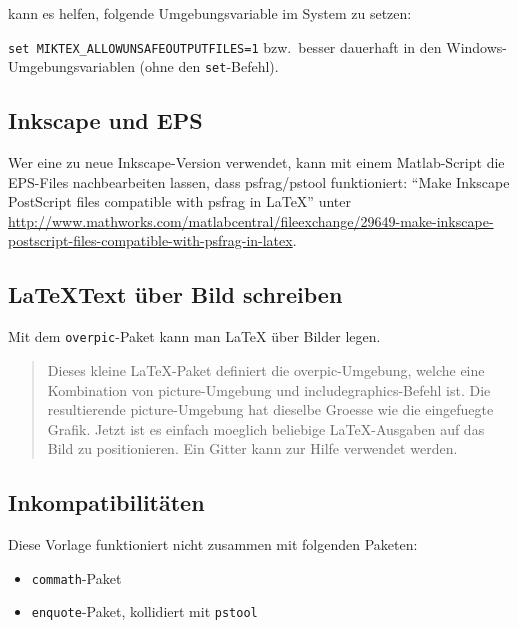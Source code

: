 kann es helfen, folgende Umgebungsvariable im System zu setzen:

\verb+set MIKTEX_ALLOWUNSAFEOUTPUTFILES=1+
bzw.\ besser dauerhaft in den Windows-Umgebungsvariablen (ohne den \texttt{set}-Befehl).

\subsection{Inkscape und EPS}
Wer eine zu neue Inkscape-Version verwendet, kann mit einem Matlab-Script die EPS-Files nachbearbeiten lassen, dass psfrag/pstool funktioniert:
\enquote{Make Inkscape PostScript files compatible with psfrag in LaTeX} unter
\url{http://www.mathworks.com/matlabcentral/fileexchange/29649-make-inkscape-postscript-files-compatible-with-psfrag-in-latex}.

\subsection[LaTeX Text über Bild schreiben]{\LaTeX Text über Bild schreiben}
Mit dem \texttt{overpic}-Paket kann man LaTeX über Bilder legen.

\begin{quote}
Dieses kleine LaTeX-Paket definiert die overpic-Umgebung, welche eine
Kombination von picture-Umgebung und includegraphics-Befehl ist. Die
resultierende picture-Umgebung hat dieselbe Groesse wie die eingefuegte Grafik.
Jetzt ist es einfach moeglich beliebige LaTeX-Ausgaben auf das Bild zu
positionieren. Ein Gitter kann zur Hilfe verwendet werden.
\end{quote}

\subsection{Inkompatibilitäten}
Diese Vorlage funktioniert nicht zusammen mit folgenden Paketen:
\begin{itemize}
	\item \texttt{commath}-Paket
	\item \texttt{enquote}-Paket, kollidiert mit \texttt{pstool}
\end{itemize}

